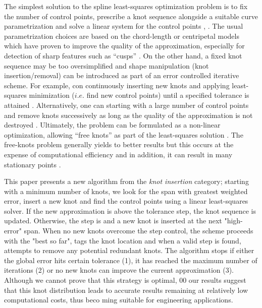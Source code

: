 \documentclass[a4paper,12pt]{article}
\begin{document}
  The simplest solution to the spline least-squares optimization problem is to fix the number of control points,
  prescribe a knot sequence alongside a suitable curve parametrization and solve a linear system for the 
  control points \cite[Ch. 9.4]{nurbs_book}, \cite{deboor1968}. 
  The usual parametrization choices are based on the chord-length or centripetal models  which 
  have proven to improve the quality of the approximation, 
  especially for detection of sharp features such as ``cusps'' \cite{hoschek1988,speer1998,lee1989, ma1995}. 
  On the other hand, a fixed knot sequence may be too oversimplified and 
  shape manipulation (knot insertion/removal) \cite{piegl1989, boehm1980, goldman1992} 
   can be introduced as part of an error controlled iterative scheme. For example, 
   con continuously inserting new knots and applying least-squares minimization 
   ($i.e.$ find new control points) until a specified tolerance is attained
    \cite{piegl2000, park2007}. Alternatively, one can starting with a large number 
    of control points and remove knots successively as long as the 
     quality of the approximation is not destroyed \cite{lyche1987, tiller1992}. 
   Ultimately, the problem can be formulated as a non-linear optimization, allowing 
   ``free knots'' as part of the least-squares solution \cite{schwetlick1995least, beliakov2004}. 
   The free-knots problem generally yields to better results but this occurs at the expense 
   of computational efficiency \cite{randrzanarivony2002} and in addition, it can result 
   in many stationary points \cite{jupp1978}.
   
   This paper presents a new algorithm from the \emph{knot insertion} category; 
   starting with a minimum number of knots, we look for the span with greatest weighted error, 
   insert a new knot and find the control points using a linear least-squares solver. 
   If the new approximation is above the tolerance step, the knot sequence is updated. 
   Otherwise, the step is and a new knot is inserted at the next  "high-error" span. 
   When no new knots overcome the step control, the scheme proceeds with the "best so far", 
   tags the knot location and when a valid step is found, 
   attempts to remove any potential redundant knots. 
    The algorithm stops if either the global error hits certain tolerance (1), it has 
    reached the maximum number of iterations (2) or no new knots can 
    improve the current approximation (3). 
  Although we cannot prove that this strategy is optimal, 00
  our results suggest that this knot distribution leads to accurate results
  remaining at relatively low computational costs, thus beco                    ming suitable  for engineering applications. 
  
\end{document}
